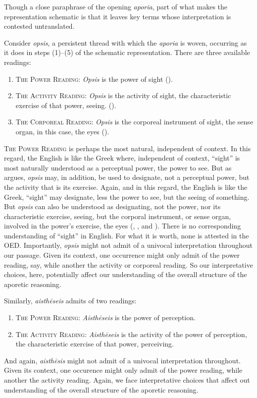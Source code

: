 Though a close paraphrase of the opening \emph{aporia}, part of what makes the representation schematic is that it leaves key terms whose interpretation is contested untranslated. 

Consider \emph{opsis}, a persistent thread with which the \emph{aporia} is woven, occurring as it does in steps (1)–(5) of the schematic representation. There are three available readings:
\begin{enumerate}[(1)]
	\item \textsc{The Power Reading}: \emph{Opsis} is the power of sight (\citealt{Johansen:2005hz}).
	\item \textsc{The Activity Reading}: \emph{Opsis} is the activity of sight, the characteristic exercise of that power, seeing. (\citealt{caston02}).
	\item \textsc{The Corporeal Reading}: \emph{Opsis} is the corporeal instrument of sight, the sense organ, in this case, the eyes (\citealt{Trubowitz:2025aa}).
\end{enumerate}
\textsc{The Power Reading} is perhaps the most natural, independent of context. In this regard, the English is like the Greek where, independent of context, ``sight'' is most naturally understood as a perceptual power, the power to see. But as \citet{caston02} argues, \emph{opsis} may, in addition, be used to designate, not a perceptual power, but the activity that is its exercise. Again, and in this regard, the English is like the Greek, ``sight'' may designate, less the power to see, but the seeing of something. But \emph{opsis} can also be understood as designating, not the power, nor its characteristic exercise, seeing, but the corporal instrument, or sense organ, involved in the power's exercise, the eyes (\citealt[]{Bonitz:1870aa}, \citealt[]{Hicks:1907uq}, and \citealt{Trubowitz:2025aa}). There is no corresponding understanding of ``sight'' in English. For what it is worth, none is attested in the OED. Importantly, \emph{opsis} might not admit of a univocal interpretation throughout our passage. Given its context, one occurrence might only admit of the power reading, say, while another the activity or corporeal reading. So our interpretative choices, here, potentially affect our understanding of the overall structure of the aporetic reasoning.

Similarly, \emph{aisthēseis} admits of two readings:
\begin{enumerate}[(1)]
	\item \textsc{The Power Reading}: \emph{Aisthēseis} is the power of perception.
	\item \textsc{The Activity Reading}: \emph{Aisthēseis} is the activity of the power of perception, the characteristic exercise of that power, perceiving.
\end{enumerate}
And again, \emph{aisthēsis} might not admit of a univocal interpretation throughout. Given its context, one occurence might only admit of the power reading, while another the activity reading. Again, we face interpretative choices that affect out understanding of the overall structure of the aporetic reasoning. 

